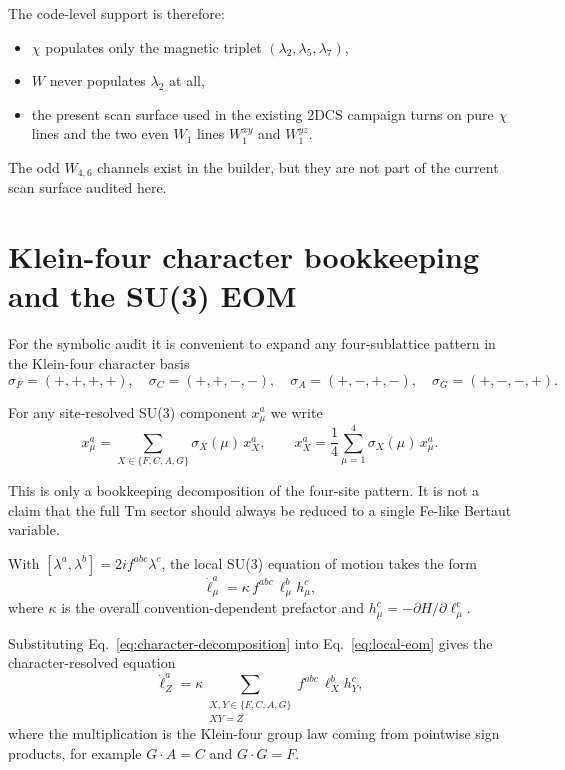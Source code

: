 \documentclass[11pt]{article}
\newcommand{\sgnF}{\sigma_F}
\newcommand{\sgnC}{\sigma_C}
\newcommand{\sgnA}{\sigma_A}
\newcommand{\sgnG}{\sigma_G}
\begin{document}
The code-level support is therefore:
\begin{itemize}[leftmargin=*]
\item $\chi$ populates only the magnetic triplet $(\lambda_2,\lambda_5,\lambda_7)$,
\item $W$ never populates $\lambda_2$ at all,
\item the present scan surface used in the existing 2DCS campaign turns on pure
      $\chi$ lines and the two even $W_1$ lines $W_1^{xy}$ and $W_1^{yz}$.
\end{itemize}

The odd $W_{4,6}$ channels exist in the builder, but they are not part of the
current scan surface audited here.

\section{Klein-four character bookkeeping and the SU(3) EOM}

For the symbolic audit it is convenient to expand any four-sublattice pattern in
the Klein-four character basis
\begin{equation}
\sgnF=(+,+,+,+),\quad
\sgnC=(+,+,-,-),\quad
\sgnA=(+,-,+,-),\quad
\sgnG=(+,-,-,+).
\label{eq:characters}
\end{equation}

For any site-resolved SU(3) component $x_\mu^a$ we write
\begin{equation}
x_\mu^a = \sum_{X\in\{F,C,A,G\}} \sigma_X(\mu) \, x_X^a,
\qquad
x_X^a = \frac{1}{4}\sum_{\mu=1}^{4}\sigma_X(\mu) \, x_\mu^a.
\label{eq:character-decomposition}
\end{equation}

This is only a bookkeeping decomposition of the four-site pattern. It is not a
claim that the full Tm sector should always be reduced to a single Fe-like
Bertaut variable.

With $[\lambda^a,\lambda^b]=2 i f^{abc}\lambda^c$, the local SU(3) equation of
motion takes the form
\begin{equation}
\dot{\ell}_\mu^a = \kappa \, f^{abc} \, \ell_\mu^b h_\mu^c,
\label{eq:local-eom}
\end{equation}
where $\kappa$ is the overall convention-dependent prefactor and
$h_\mu^c = -\partial H / \partial \ell_\mu^c$.

Substituting Eq.~\eqref{eq:character-decomposition} into
Eq.~\eqref{eq:local-eom} gives the character-resolved equation
\begin{equation}
\dot{\ell}_Z^a
=
\kappa \sum_{\substack{X,Y\in\{F,C,A,G\}\\XY=Z}}
f^{abc} \, \ell_X^b h_Y^c,
\label{eq:character-eom}
\end{equation}
where the multiplication is the Klein-four group law coming from pointwise sign
products, for example $G\cdot A=C$ and $G\cdot G=F$.
\end{document}
